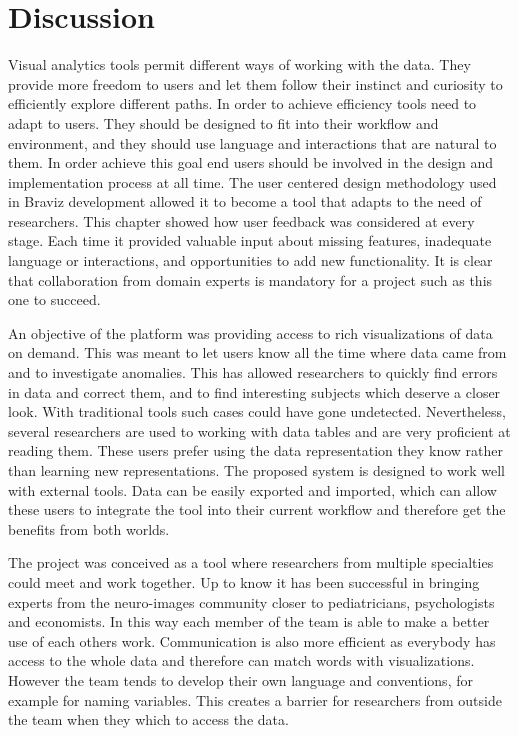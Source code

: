 \section{Discussion}

Visual analytics tools permit different ways of working with the data. They provide more freedom to users and let them follow their instinct and curiosity to efficiently explore different paths. In order to achieve efficiency tools need to adapt to users. They should be designed to fit into their workflow and environment, and they should use language and interactions that are natural to them. In order achieve this goal end users should be involved in the design and implementation process at all time. The user centered design methodology used in Braviz development allowed it to become a tool that adapts to the need of researchers. This chapter showed how user feedback was considered at every stage. Each time it provided valuable input about missing features, inadequate language or interactions, and opportunities to add new functionality. It is clear that collaboration from domain experts is mandatory for a project such as this one to succeed.

An objective of the platform was providing access to rich visualizations of data on demand. This was meant to let users know all the time where data came from and to investigate anomalies. This has allowed researchers to quickly find errors in data and correct them, and to find interesting subjects which deserve a closer look. With traditional tools such cases could have gone undetected. Nevertheless, several researchers are used to working with data tables and are very proficient at reading them. These users prefer using the data representation they know rather than learning new representations. The proposed system is designed to work well with external tools. Data can be easily exported and imported, which can allow these users to integrate the tool into their current workflow and therefore get the benefits from both worlds.

The project was conceived as a tool where researchers from multiple specialties could meet and work together. Up to know it has been successful in bringing experts from the neuro-images community closer to pediatricians, psychologists and economists. In this way each member of the team is able to make a better use of each others work. Communication is also more efficient as everybody has access to the whole data and therefore can match words with visualizations. However the team tends to develop their own language and conventions, for example for naming variables. This creates a barrier for researchers from outside the team when they which to access the data. 


